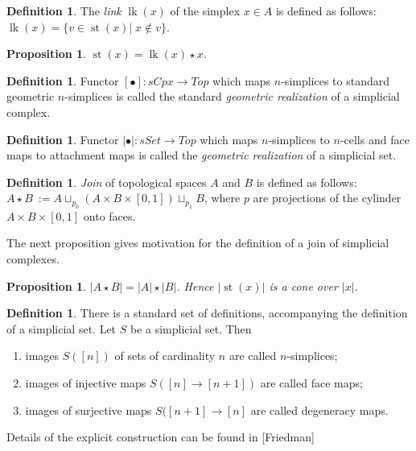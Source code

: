 \documentclass[english,12pt]{article}
\newcounter{stmcounter}[section]
\numberwithin{equation}{section}
\newtheorem{proposition}[stmcounter]{Proposition}
\theoremstyle{definition}
\newtheorem{definition}[stmcounter]{Definition}
\theoremstyle{remark}
\newcommand{\define}[1]{{\textit{#1}}}
\begin{document}
\begin{definition}
  The \define{link} $\operatorname{lk}(x)$ of the simplex $x \in A$ is defined as follows: $\operatorname{lk}(x) = \{v \in \operatorname{st}(x)|\; x \not\in v\}$.
\end{definition}

\begin{proposition}
  $\operatorname{st}(x) = \operatorname{lk}(x) \star x$.
\end{proposition}

\begin{definition}
  Functor $\left[\bullet\right] : sCpx \to Top$ which maps $n$-simplices to standard geometric $n$-simplices is called the standard \define{geometric realization} of a simplicial complex.
\end{definition}

\begin{definition}
  Functor $\left|\bullet\right| : sSet \to Top$ which maps $n$-simplices to $n$-cells and face maps to attachment maps is called the \define{geometric realization} of a simplicial set.
\end{definition}

\begin{definition}
  \define{Join} of topological spaces $A$ and $B$ is defined as follows: $A \star B\ := A \sqcup_{p_0} (A \times B \times [0,1]) \sqcup_{p_1} B$, where $p$ are projections of the cylinder $A \times B \times [0,1]$ onto faces.
\end{definition}

The next proposition gives motivation for the definition of a join of simplicial complexes.

\begin{proposition}
  $\left|A \star B\right| = \left|A\right| \star \left|B\right|$. Hence $\left|\operatorname{st}(x)\right|$ is a cone over $\left|x\right|$.
\end{proposition}

\begin{definition}
  There is a standard set of definitions, accompanying the definition of a simplicial set. Let $S$ be a simplicial set. Then
  \begin{enumerate}
    \item images $S([n])$ of sets of cardinality $n$ are called $n$-simplices;
    \item images of injective maps $S([n] \to [n+1])$ are called face maps;
    \item images of surjective maps $S([n+1] \to [n]$ are called degeneracy maps.
  \end{enumerate}
  
  Details of the explicit construction can be found in [Friedman]
\end{definition}
\end{document}
